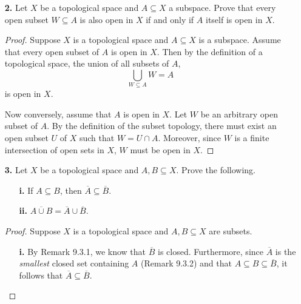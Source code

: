 \documentclass[ 12pt ]{article}
\begin{document}
\begin{enumerate}
\begin{proof}
\begin{enumerate}
				\item[\textbf{iv.}] Consider the set $D = \left \{ x : \frac{1}{2} \leq |x| < \leq \right \}$. Clearly we can see that $D$ is closed and not open in $\mathbb{R}$. In
					regard to the openness of $D$ in $Y$, we can see that it is not open via the same argument in \textbf{1iii}.
			\end{enumerate}
		\end{proof}


	\item[\textbf{2.}] Let $X$ be a topological space and $A \subseteq X$ a subspace. Prove that every open subset $W \subseteq A$ is also open in $X$ if and only if $A$ itself is open
		in $X$.

		\begin{proof}
			Suppose $X$ is a topological space and $A \subseteq X$ is a subspace. Assume that every open subset of $A$ is open in $X$. Then by the definition of a topological space, the
			union of all subsets of $A$, $$\bigcup_{W \subseteq A} W = A$$ is open in $X$.

			Now conversely, assume that $A$ is open in $X$. Let $W$ be an arbitrary open subset of $A$. By the definition of the subset topology, there must exist an open subset $U$ of
			$X$ such that $W = U \cap A$. Moreover, since $W$ is a finite intersection of open sets in $X$, $W$ must be open in $X$.
		\end{proof}

	\item[\textbf{3.}] Let $X$ be a topological space and $A, B \subseteq X$. Prove the following.
		\begin{enumerate}
			\item[\textbf{i.}] If $A \subseteq B$, then $\overline{A} \subseteq \overline{B}$.
			\item[\textbf{ii.}] $\overline{A \cup B} = \overline{A} \cup \overline{B}$.
		\end{enumerate}

		\begin{proof}
			Suppose $X$ is a topological space and $A, B \subseteq X$ are subsets.
			\begin{enumerate}
				\item[\textbf{i.}] By Remark 9.3.1, we know that $\overline{B}$ is closed. Furthermore, since $\overline{A}$ is the \textit{smallest} closed set containing $A$ (Remark
					9.3.2) and that $A \subseteq B \subseteq \overline{B}$, it follows that $\overline{A} \subseteq \overline{B}$.


\end{enumerate}
\end{proof}
\end{enumerate}
\end{document}
